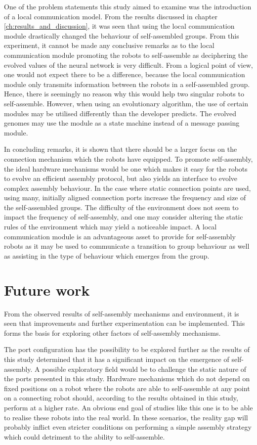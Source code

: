 One of the problem statements this study aimed to examine was the introduction of a local communication model. From the results discussed in chapter  \ref{ch:results_and_discussion}, it was seen that using the local communication module drastically changed the behaviour of self-assembled groups. 
From this experiment, it cannot be made any conclusive remarks as to the local communication module promoting the robots to self-assemble as deciphering the evolved values of the neural network is very difficult.
From a logical point of view, one would not expect there to be a difference, because the local communication module only transmits information between the robots in a self-assembled group. 
Hence, there is seemingly no reason why this would help two singular robots to self-assemble.
However, when using an evolutionary algorithm, the use of certain modules may be utilised differently than the developer predicts.
The evolved genomes may use the module as a state machine instead of a message passing module.

In concluding remarks, it is shown that there should be a larger focus on the connection mechanism which the robots have equipped.
To promote self-assembly, the ideal hardware mechanisms would be one which makes it easy for the robots to evolve an efficient assembly protocol, but also yields an interface to evolve complex assembly behaviour.
In the case where static connection points are used, using many, initially aligned connection ports increase the frequency and size of the self-assembled groups.
The difficulty of the environment does not seem to impact the frequency of self-assembly, and one may consider altering the static rules of the environment which may yield a noticeable impact.
A local communication module is an advantageous asset to provide for self-assembly robots as it may be used to communicate a transition to group behaviour as well as assisting in the type of behaviour which emerges from the group. 
  


\section{Future work}
From the observed results of self-assembly mechanisms and environment, it is seen that improvements and further experimentation can be implemented. 
This forms the basis for exploring other factors of self-assembly mechanisms.

The port configuration has the possibility to be explored further as the results of this study determined that it has a significant impact on the emergence of self-assembly. 
A possible exploratory field would be to challenge the static nature of the ports presented in this study.
Hardware mechanisms which do not depend on fixed positions on a robot where the robots are able to self-assemble at any point on a connecting robot should, according to the results obtained in this study, perform at a higher rate.
An obvious end goal of studies like this one is to be able to realise these robots into the real world.
In these scenarios, the reality gap will probably inflict even stricter conditions on performing a simple assembly strategy which could detriment to the ability to self-assemble.

